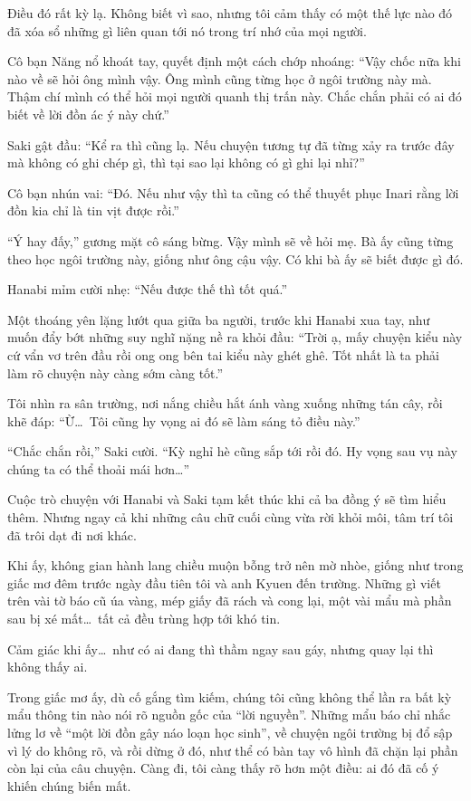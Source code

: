 \documentclass[../main.tex]{subfiles}
\begin{document}
Điều đó rất kỳ lạ. Không biết vì sao, nhưng tôi cảm thấy có một thế lực nào đó đã xóa sổ những gì liên quan tới nó trong trí nhớ của mọi người.

Cô bạn Năng nổ khoát tay, quyết định một cách chớp nhoáng: ``Vậy chốc nữa khi nào về sẽ hỏi ông mình vậy. Ông mình cũng từng học ở ngôi trường này mà. Thậm chí mình có thể hỏi mọi người quanh thị trấn này. Chắc chắn phải có ai đó biết về lời đồn ác ý này chứ.''

Saki gật đầu: ``Kể ra thì cũng lạ. Nếu chuyện tương tự đã từng xảy ra trước đây mà không có ghi chép gì, thì tại sao lại không có gì ghi lại nhỉ?''

Cô bạn nhún vai: ``Đó. Nếu như vậy thì ta cũng có thể thuyết phục Inari rằng lời đồn kia chỉ là tin vịt được rồi.''

``Ý hay đấy,'' gương mặt cô sáng bừng. Vậy mình sẽ về hỏi mẹ. Bà ấy cũng từng theo học ngôi trường này, giống như ông cậu vậy. Có khi bà ấy sẽ biết được gì đó.

Hanabi mỉm cười nhẹ: ``Nếu được thế thì tốt quá.''

Một thoáng yên lặng lướt qua giữa ba người, trước khi Hanabi xua tay, như muốn đẩy bớt những suy nghĩ nặng nề ra khỏi đầu: ``Trời ạ, mấy chuyện kiểu này cứ vẩn vơ trên đầu rồi ong ong bên tai kiểu này ghét ghê. Tốt nhất là ta phải làm rõ chuyện này càng sớm càng tốt.''

Tôi nhìn ra sân trường, nơi nắng chiều hắt ánh vàng xuống những tán cây, rồi khẽ đáp: ``Ừ\dots\ Tôi cũng hy vọng ai đó sẽ làm sáng tỏ điều này.''

``Chắc chắn rồi,'' Saki cười. ``Kỳ nghỉ hè cũng sắp tới rồi đó. Hy vọng sau vụ này chúng ta có thể thoải mái hơn\dots''

Cuộc trò chuyện với Hanabi và Saki tạm kết thúc khi cả ba đồng ý sẽ tìm hiểu thêm. Nhưng ngay cả khi những câu chữ cuối cùng vừa rời khỏi môi, tâm trí tôi đã trôi dạt đi nơi khác.

Khi ấy, không gian hành lang chiều muộn bỗng trở nên mờ nhòe, giống như trong giấc mơ đêm trước ngày đầu tiên tôi và anh Kyuen đến trường. Những gì viết trên vài tờ báo cũ úa vàng, mép giấy đã rách và cong lại, một vài mẩu mà phần sau bị xé mất\dots\ tất cả đều trùng hợp tới khó tin.

Cảm giác khi ấy\dots\ như có ai đang thì thầm ngay sau gáy, nhưng quay lại thì không thấy ai.

Trong giấc mơ ấy, dù cố gắng tìm kiếm, chúng tôi cũng không thể lần ra bất kỳ mẩu thông tin nào nói rõ nguồn gốc của ``lời nguyền''. Những mẩu báo chỉ nhắc lửng lơ về ``một lời đồn gây náo loạn học sinh'', về chuyện ngôi trường bị đổ sập vì lý do không rõ, và rồi dừng ở đó, như thể có bàn tay vô hình đã chặn lại phần còn lại của câu chuyện. Càng đi, tôi càng thấy rõ hơn một điều: ai đó đã cố ý khiến chúng biến mất.
\end{document}
